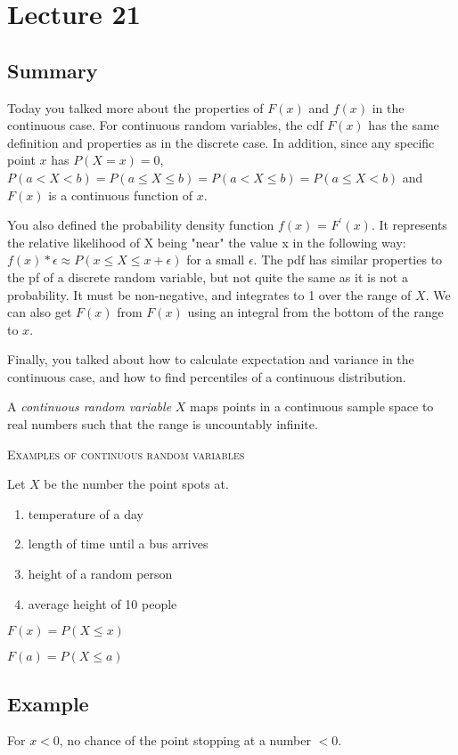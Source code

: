\section{Lecture 21}
\subsection{Summary}
Today you talked more about the properties of $F(x)$ and $f(x)$ in the continuous case. For continuous random variables, the cdf $F(x)$ has the same definition and properties as in the discrete case. In addition, since any specific point $x$ has $P(X=x) = 0$, 
$P(a<X<b) = P(a\le X\le b) = P(a<X\le b) = P(a\le X<b)$
 and $F(x)$ is a continuous function of $x$. 

You also defined the probability density function $f(x)$ = $F^\prime(x)$. It represents the relative likelihood of X being "near" the value x in the following way: $f(x)*\epsilon\approx P(x\le X\le x+\epsilon)$ for a small $\epsilon$. The pdf has similar properties to the pf of a discrete random variable, but not quite the same as it is not a probability. It must be non-negative, and integrates to 1 over the range of $X$. We can also get $F(x)$ from $F(x)$ using an integral from the bottom of the range to $x$.

Finally, you talked about how to calculate expectation and variance in the continuous case, and how to find percentiles of a continuous distribution.

A \emph{continuous random variable} $ X $ maps points in a continuous
sample space to real numbers such that the range is uncountably infinite.

\textsc{Examples of continuous random variables}

Let $ X $ be the number the point spots at.
\begin{enumerate}[(1)]
    \item temperature of a day
    \item length of time until a bus arrives
    \item height of a random person
    \item average height of 10 people
\end{enumerate}

$F(x)=P(X\le x)$

$F(a)=P(X\le a) $

\subsection{Example}
For $ x<0 $, no chance of the point stopping at a number $ <0 $.

